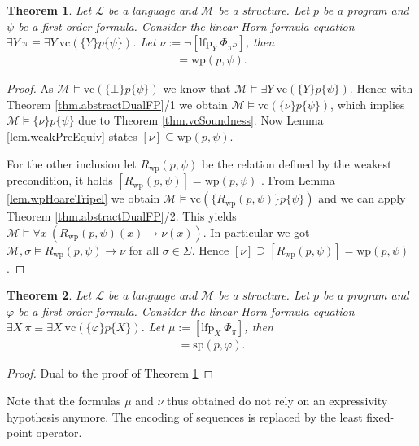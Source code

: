 \documentclass[acmsmall]{acmart}
\theoremstyle{plain}
\newtheorem{theorem}{Theorem}
\theoremstyle{definition}
\newcommand{\calL}{\mathcal{L}}
\newcommand{\calM}{\mathcal{M}}
\newcommand{\mybar}[1]{\overline{#1}}
\newcommand{\lfp}{\mathrm{lfp}} %
\newcommand{\hoare}[3]{\{#1\}#2\{#3\}}
\newcommand{\vc}{\mathrm{vc}}
\renewcommand{\wp}{\mathrm{wp}}
\newcommand{\Rwp}{R_{\wp}}
\renewcommand{\sp}{\mathrm{sp}}
\begin{document}
\begin{theorem}\label{thm.wpLfpNu}
	Let $\calL$ be a language and $\calM$ be a structure. Let $p$ be a program and $\psi$ be a first-order formula. Consider the linear-Horn formula equation $\exists Y ~\pi \equiv \exists Y~ \vc(\hoare{Y}{p}{\psi})$. Let $\nu := \neg [\lfp_{Y} ~\Phi_{\pi^D}]$, then 
	\begin{align*}
		[\nu] = \wp(p,\psi).
	\end{align*}
\end{theorem}
\begin{proof}
	As $\calM \models \vc(\hoare{\bot}{p}{\psi})$ we know that $\calM \models \exists Y~ \vc(\hoare{Y}{p}{\psi})$.  Hence with Theorem \ref{thm.abstractDualFP}/1 we obtain $\calM \models \vc(\hoare{\nu}{p}{\psi})$, which implies $\calM \models \hoare{\nu}{p}{\psi}$ due to Theorem \ref{thm.vcSoundness}. Now Lemma \ref{lem.weakPreEquiv} states $[\nu] \subseteq \wp(p,\psi)$.
	
	For the other inclusion let $\Rwp(p,\psi)$ be the relation defined by the weakest precondition, it holds $[\Rwp(p,\psi)] = \wp(p,\psi)$ . From Lemma \ref{lem.wpHoareTripel} we obtain $\calM \models \vc(\hoare{\Rwp(p,\psi)}{p}{\psi})$ and we can apply Theorem \ref{thm.abstractDualFP}/2. This yields $\calM \models \forall \mybar{x}~ (\Rwp(p,\psi)(\mybar{x}) \rightarrow \nu(\mybar{x}))$. In particular we got $\calM, \sigma \models \Rwp(p,\psi) \rightarrow \nu$ for all $\sigma \in \Sigma$. Hence $[\nu] \supseteq [\Rwp(p,\psi)] = \wp(p,\psi)$.
\end{proof}

\begin{theorem}\label{thm.spLfpMu}
	Let $\calL$ be a language and $\calM$ be a structure. Let $p$ be a program and $\varphi$ be a first-order formula. Consider the linear-Horn formula equation $\exists X ~\pi \equiv \exists X~ \vc(\hoare{\varphi}{p}{X})$. Let $\mu := [\lfp_{X} ~\Phi_{\pi}]$, then 
	\begin{align*}
		[\mu] = \sp(p,\varphi).
	\end{align*}
\end{theorem}
\begin{proof}
	Dual to the proof of Theorem \ref{thm.wpLfpNu}
\end{proof}

%


Note that the formulas $\mu$ and $\nu$ thus obtained do not rely on an expressivity hypothesis anymore.
The encoding of sequences is replaced by the least fixed-point operator.
\end{document}
